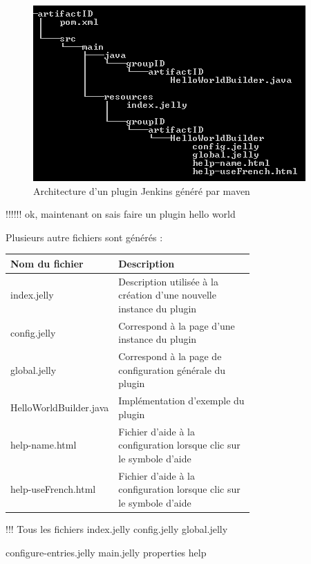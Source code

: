 \begin{figure}[!h]%
  \centering
      \includegraphics{images/hpiCreate.png}
  \caption{Architecture d'un plugin Jenkins généré par maven}
	\label{figure:hpiCreate}
\end{figure}
!!!!!! ok, maintenant on sais faire un plugin hello world

Plusieurs autre fichiers sont générés :

\begin{tabular}{|l|p{0.7\linewidth}|}
  \hline
  \textbf{Nom du fichier} & \textbf{Description} \\
  \hline
  index.jelly & Description utilisée à la création d'une nouvelle instance du plugin \\
  config.jelly & Correspond à la page d'une instance du plugin \\
  global.jelly & Correspond à la page de configuration générale du plugin \\
  HelloWorldBuilder.java & Implémentation d'exemple du plugin \\
  help-name.html & Fichier d'aide à la configuration lorsque clic sur le symbole d'aide \\
  help-useFrench.html & Fichier d'aide à la configuration lorsque clic sur le symbole d'aide \\
  \hline
\end{tabular}




!!! Tous les fichiers
index.jelly
config.jelly
global.jelly

configure-entries.jelly
main.jelly
properties
help


